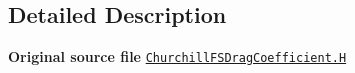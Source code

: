 \subsection{Detailed Description}
{\bfseries Original source file} \href{../../../home/carlo/data/GeN-Foam/GeN-Foam_ffn/GeN-Foam/GeN-Foam/classes/thermalHydraulics/src/physicsModels/dragModels/FSDragCoefficientModels/Churchill/ChurchillFSDragCoefficient.H}{\tt Churchill\+F\+S\+Drag\+Coefficient.\+H} 